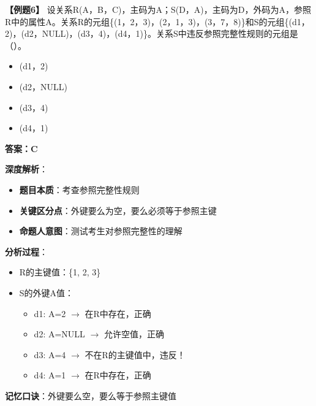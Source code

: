 \documentclass[12pt, a4paper]{article}
\newenvironment{bluebox}[1]{%
  \begin{trivlist}
  \item[\hskip\labelsep \textbf{#1}]
  \setlength{\parskip}{0.5ex}
  \setlength{\itemsep}{0.5ex}
}{%
  \end{trivlist}
}
\begin{document}
\begin{bluebox}{例题6：参照完整性}
	\textbf{【例题6】} 设关系R(A，B，C)，主码为A；S(D，A)，主码为D，外码为A，参照R中的属性A。关系R的元组\{(1，2，3)，(2，1，3)，(3，7，8)\}和S的元组\{(d1，2)，(d2，NULL)，(d3，4)，(d4，1)\}。关系S中违反参照完整性规则的元组是（\quad）。

	\begin{itemize}
		\item[A)] (d1，2)
		\item[B)] (d2，NULL)
		\item[C)] (d3，4)
		\item[D)] (d4，1)
	\end{itemize}

	\textbf{答案：C}

	\textbf{深度解析}：

	\begin{itemize}
		\item \textbf{题目本质}：考查参照完整性规则
		\item \textbf{关键区分点}：外键要么为空，要么必须等于参照主键
		\item \textbf{命题人意图}：测试考生对参照完整性的理解
	\end{itemize}

	\textbf{分析过程}：

	\begin{itemize}
		\item R的主键值：\{1, 2, 3\}
		\item S的外键A值：
		      \begin{itemize}
			      \item d1: A=2 $\rightarrow$ 在R中存在，正确
			      \item d2: A=NULL $\rightarrow$ 允许空值，正确
			      \item d3: A=4 $\rightarrow$ 不在R的主键值中，违反！
			      \item d4: A=1 $\rightarrow$ 在R中存在，正确
		      \end{itemize}
	\end{itemize}

	\textbf{记忆口诀}：外键要么空，要么等于参照主键值
\end{bluebox}
\end{document}
